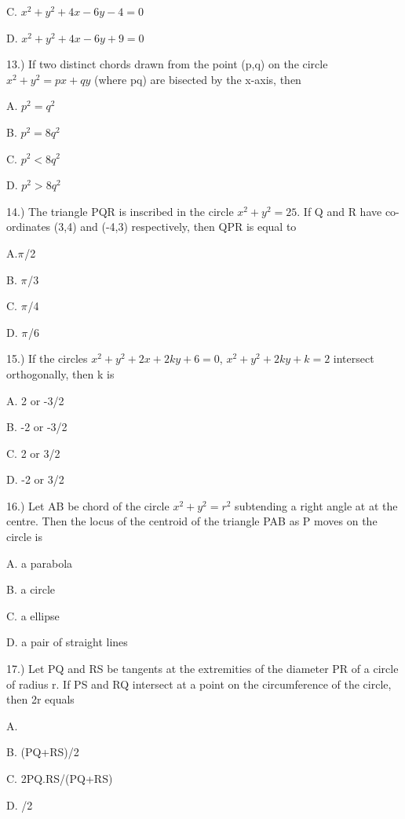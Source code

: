 \documentclass{article}
\begin{document}
\choice  C. $x^2+y^2+4x-6y-4=0$

\choice  D. $x^2+y^2+4x-6y+9=0$

\vspace{5mm}
13.) If two distinct chords drawn from the point (p,q) on the circle $x^2+y^2=px+qy$ (where pq) are bisected by the x-axis, then

\choice  A. $p^2=q^2$

\choice  B. $p^2=8q^2$

\choice  C. $p^2 < 8q^2$

\choice  D. $p^2 > 8q^2$

\vspace{5mm}
14.) The triangle PQR is inscribed in the circle $x^2+y^2=25$. If Q and  R have co-ordinates (3,4) and (-4,3) respectively, then \angle QPR  is equal to

\choice  A.$\pi_{}$/2

\choice  B. $\pi_{}$/3

\choice  C. $\pi_{}$/4

\choice  D. $\pi_{}$/6

\vspace{5mm}
15.) If the circles $x^2+y^2+2x+2ky+6=0$, $x^2+y^2+2ky+k=2$ intersect orthogonally, then k is

\choice  A. 2 or -3/2

\choice  B. -2 or -3/2

\choice  C. 2 or 3/2

\choice  D. -2 or 3/2

\vspace{5mm}
16.) Let AB be chord of the circle $x^2+y^2=r^2$ subtending a right angle at at the centre. Then the locus of the centroid of the triangle PAB as P moves on the circle is

\choice  A. a parabola

\choice  B. a circle

\choice  C. a ellipse

\choice  D. a pair of straight lines

\vspace{5mm}
17.) Let PQ and RS be tangents at the extremities of the diameter PR of a circle of radius r. If PS and RQ intersect at a point on the circumference of the circle, then 2r equals

\choice  A. 

\choice  B. (PQ+RS)/2

\choice  C. 2PQ.RS/(PQ+RS)

\choice  D.  /2
\end{document}
